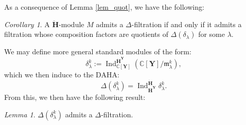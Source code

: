\documentclass[a4paper]{report}
\theoremstyle{theorem}
\theoremstyle{definition}
\theoremstyle{remark}
\theoremstyle{proposition}
\theoremstyle{conjecture}
\theoremstyle{lemma}
\newtheorem{lemma}{Lemma}
\theoremstyle{corollary}
\newtheorem{corollary}{Corollary}
\theoremstyle{exercise}
\theoremstyle{example}
\newcommand{\C}{\mathbb{C}}
\newcommand{\on}{\operatorname}
\begin{document}
  As a consequence of Lemma \ref{lem_quot}, we have the following:
  
  \begin{corollary}\label{cor_delta_filt_iff}
      A $\mathbf{\ddot{\mathbf{H}}}$-module $M$ admits a $\Delta$-filtration if and only if
      it admits a filtration whose composition factors are quotients of 
      $\Delta(\delta_\lambda)$ for some $\lambda$.
  \end{corollary}
  
  We may define more general standard modules of the form: 
  $$\delta_\lambda^k := \on{Ind}_{\C[\mathbf{Y}]}^{\mathbf{\dot{H}}^{\mathbf{Y}}} \left(\C[\mathbf{Y}]/\mathfrak{m}_\lambda^k\right),$$
  which we then induce to the DAHA:
  $$\Delta(\delta_\lambda^k) = \on{Ind}_{\mathbf{\dot{H}}^{\mathbf{Y}}}^{\mathbf{\ddot{\mathbf{H}}}} \delta_\lambda^k.$$
  From this, we then have the following result:
  
  \begin{lemma}\label{lem_step1}
      $\Delta(\delta_\lambda^k)$ admits a $\Delta$-filtration.
  \end{lemma}
  
\end{document}
